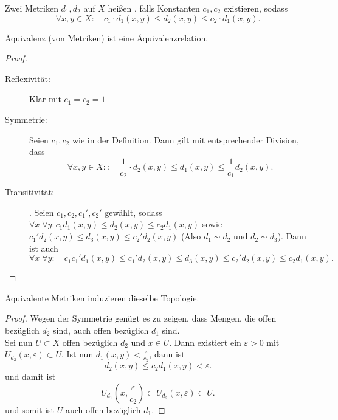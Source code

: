 

\begin{definition}\label{def:äquivalente-metrik}
    Zwei Metriken $d_1,d_2$ auf $X$ heißen , falls Konstanten $c_1,c_2$ existieren, sodass
    \[
        \forall x,y\in X \colon \quad c_1\cdot d_1(x,y) \leq  d_2(x,y) \leq  c_2\cdot d_1(x,y)
    .\] 
\end{definition}
\begin{theorem}\label{thm:äquivalenz-von-metriken-ist-äquivalenzrelation}
    Äquivalenz (von Metriken) ist eine Äquivalenzrelation.
\end{theorem}
\begin{proof}
    \begin{description}
        \item[Reflexivität:] Klar mit $c_1 = c_2 = 1$
        \item[Symmetrie:] Seien $c_1,c_2$ wie in der Definition. Dann gilt mit entsprechender Division, dass
            \[
                \forall x,y \in X \colon : \quad \frac{1}{c_2}\cdot d_2(x,y) \leq  d_1(x,y) \leq  \frac{1}{c_1}d_2(x,y)
            .\] 
        \item[Transitivität:]. Seien $c_1,c_2,c_1',c_2'$ gewählt, sodass $\forall x \; \forall y\colon c_1d_1 (x,y) \leq  d_2 (x,y)\leq  c_2d_1(x,y)$ sowie $c_1'd_2 (x,y)\leq  d_3(x,y) \leq  c_2'd_2(x,y)$ (Also $d_1 \sim  d_2$ und $d_2 \sim d_3$). Dann ist auch
            \[
\forall x \; \forall y \colon \quad                c_1c_1'd_1(x,y) \leq  c_1'd_2(x,y)\leq d_3(x,y) \leq  c_2'd_2 (x,y) \leq  c_2d_1(x,y)
            .\] 
    \end{description}
\end{proof}

\begin{theorem}\label{thm:äquivalente-metriken-erzeugen-dieselbe-topologie}
    Äquivalente Metriken induzieren dieselbe Topologie.
\end{theorem}
\begin{proof}
    Wegen der Symmetrie genügt es zu zeigen, dass Mengen, die offen bezüglich $d_2$ sind, auch offen bezüglich $d_1$ sind. \\
    Sei nun $U\subset X$ offen bezüglich $d_2$ und $x\in U$. Dann existiert ein $ε>0$ mit  $U_{d_2}(x,ε) \subset U$. Ist nun $d_1(x,y) < \frac{ε}{c_2}$, dann ist
    \[
        d_2(x,y) \leq  c_2d_1(x,y) < ε
    .\] 
und damit ist
\[
    U_{d_1}\left(x,\frac{ε}{c_2}\right) \subset U_{d_2} \left( x,ε \right) \subset U
.\] 
und somit ist $U$ auch offen bezüglich  $d_1$.
\end{proof}

